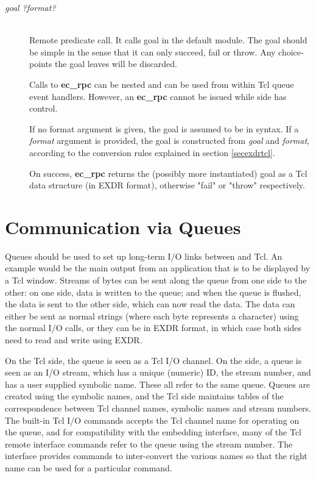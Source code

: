 \begin{description}
\item[ {\it goal ?format?}]\ \\
        Remote {\eclipse} predicate call.
        It calls goal in the default module. The goal should be simple
	in the sense that it can only succeed, fail or throw.
        Any choice-points the goal leaves will be discarded.

	Calls to {\bf ec_rpc} can be nested
	and can be used from within Tcl queue event handlers. However, an
	{\bf ec_rpc} cannot be issued while {\eclipse} side has control.

	If no format argument is given, the goal is assumed to be in
	{\eclipse} syntax. If a {\it format} argument is provided,
	the {\eclipse} goal is constructed from {\it goal} and {\it format},
	according to the conversion rules explained in section \ref{secexdrtcl}.

        On success, {\bf ec_rpc} returns the (possibly more instantiated)
	goal as a Tcl data structure (in EXDR format), otherwise "fail" or 
        "throw" respectively.
\end{description}

\section{Communication via Queues}

Queues should be used to set up long-term I/O links between {\eclipse} and
Tcl. An example would be the main output from an application that is to be
displayed by a Tcl window.  Streams of bytes can be sent along the queue
from one side to the other: on one side, data is written to the queue; and
when the queue is flushed, the data is sent to the other side, which can
now read the data. The data can either be sent as normal strings (where
each byte represents a character) using the normal I/O calls, or they can
be in EXDR format, in which case both sides need to read and write using
EXDR.

On the Tcl side, the queue is seen as a Tcl I/O
channel. On the {\eclipse} side, a queue is
seen as an {\eclipse} I/O stream, which has a unique (numeric) ID, the
stream number, and has a user supplied symbolic
name. These all refer to the same queue. Queues are created using the symbolic names, and the Tcl side
maintains tables of the correspondence between Tcl channel names, symbolic
names and stream numbers. The built-in Tcl I/O commands accepts the Tcl
channel name for operating on the queue, and for 
compatibility with the embedding interface, many of the Tcl remote
interface commands refer to the queue using the stream number. The
interface provides commands to inter-convert the various names so that the
right name can be used for a particular command.


